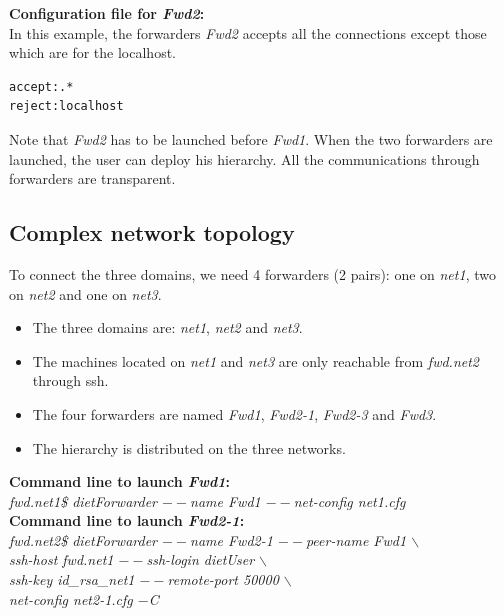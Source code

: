 \noindent\textbf{Configuration file for \textit{Fwd2}:}\\
In this example, the forwarders \textit{Fwd2} accepts all the
connections except those which are for the localhost.
\begin{verbatim}
accept:.*
reject:localhost
\end{verbatim}

Note that \textit{Fwd2} has to be launched before \textit{Fwd1}.
When the two forwarders are launched, the user can deploy his \diet
hierarchy. All the communications through  \diet forwarders are
transparent.

\subsection{Complex network topology}
To connect the three domains, we need 4 forwarders (2 pairs): one on
\textit{net1}, two on \textit{net2} and one on \textit{net3}.
\begin{itemize}
\item The three domains are: \textit{net1}, \textit{net2} and
  \textit{net3}.
\item The machines located on \textit{net1} and \textit{net3} are only
  reachable from \textit{fwd.net2} through ssh.
\item The four forwarders are named \textit{Fwd1}, \textit{Fwd2-1},
  \textit{Fwd2-3} and \textit{Fwd3}.
\item The \diet hierarchy is distributed on the three networks.\\
\end{itemize}

\noindent\textbf{Command line to launch \textit{Fwd1}: }\\
{\small \it fwd.net1\$ dietForwarder {\tiny$--$}name Fwd1
  {\tiny$--$}net-config net1.cfg}\\[2mm]

\noindent\textbf{Command line to launch \textit{Fwd2-1}: }\\
{\small \it fwd.net2\$ dietForwarder {\tiny$--$}name Fwd2-1
  {\tiny$--$}peer-name Fwd1 $\backslash$\\
  \hspace*{4.2cm}{\tiny$--$}ssh-host fwd.net1 {\tiny$--$}ssh-login
  dietUser $\backslash$\\
  \hspace*{4.2cm}{\tiny$--$}ssh-key id\_rsa\_net1
  {\tiny$--$}remote-port 50000 $\backslash$\\
  \hspace*{4.2cm}{\tiny$--$}net-config net2-1.cfg {\tiny$-$}C}\\[2mm]

